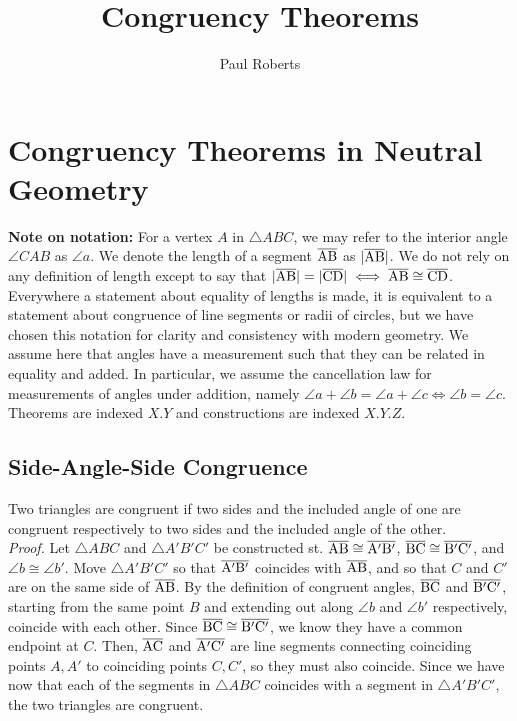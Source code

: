 \documentclass{report}
\title{Congruency Theorems}
\author{Paul Roberts}
\date{}
\begin{document}
\chapter{Congruency Theorems in Neutral Geometry}

\textbf{Note on notation:} For a vertex $A$ in $\triangle{ABC}$, we may refer to the interior angle $\angle CAB$ as $\angle a$. We denote the length of a segment $\overline{\rm AB}$ as $|\overline{\rm AB}|$. We do not rely on any definition of length except to say that $|\overline{\rm AB}| = |\overline{\rm CD}| \iff \overline{\rm AB} \cong \overline{\rm CD}$. Everywhere a statement about equality of lengths is made, it is equivalent to a statement about congruence of line segments or radii of circles, but we have chosen this notation for clarity and consistency with modern geometry. We assume here that angles have a measurement such that they can be related in equality and added. In particular, we assume the cancellation law for measurements of angles under addition, namely $\angle a + \angle b = \angle a + \angle c \iff \angle b = \angle c$.
\\[\baselineskip]Theorems are indexed $X.Y$ and constructions are indexed $X.Y.Z$.


\section{Side-Angle-Side Congruence}
Two triangles are congruent if two sides and the included angle of one are congruent respectively to two sides and the included angle of the other.
\\[\baselineskip] \textit{Proof.} Let $\triangle{ABC}$ and $\triangle{A'B'C'}$ be constructed st. $\overline{\rm AB} \cong \overline{\rm A'B'}$, $\overline{\rm BC} \cong \overline{\rm B'C'}$, and $\angle b  \cong \angle b'$. Move $\triangle{A'B'C'}$ so that $\overline{\rm A'B'}$ coincides with $\overline{\rm AB}$, and so that $C$ and $C'$ are on the same side of $\overline{\rm AB}$. By the definition of congruent angles, $\overline{\rm BC}$ and $\overline{\rm B'C'}$, starting from the same point $B$ and extending out along $\angle b$ and $\angle b'$ respectively, coincide with each other. Since $\overline{\rm BC} \cong \overline{\rm B'C'}$, we know they have a common endpoint at $C$. Then, $\overline{\rm AC}$ and $\overline{\rm A'C'}$ are line segments connecting coinciding points $A, A'$ to coinciding points $C, C'$, so they must also coincide. Since we have now that each of the segments in $\triangle{ABC}$ coincides with a segment in $\triangle{A'B'C'}$, the two triangles are congruent.
\end{document}
